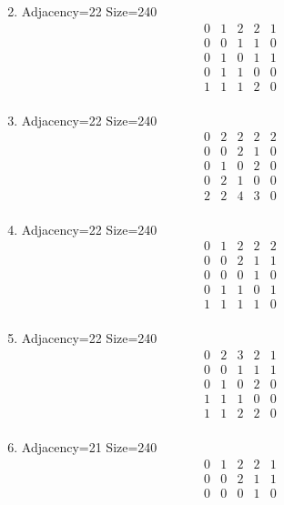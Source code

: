 \documentclass[12pt]{article}
\begin{document}
\begin{multicols}{3}
\begin{enumerate}
\begin{equation*}
\end{equation*}
\item Adjacency=22 Size=240
\begin{equation*}
\begin{array}{ccccc}
0&1&2&2&1\\
0&0&1&1&0\\
0&1&0&1&1\\
0&1&1&0&0\\
1&1&1&2&0\\
\end{array}
\end{equation*}
\item Adjacency=22 Size=240
\begin{equation*}
\begin{array}{ccccc}
0&2&2&2&2\\
0&0&2&1&0\\
0&1&0&2&0\\
0&2&1&0&0\\
2&2&4&3&0\\
\end{array}
\end{equation*}
\item Adjacency=22 Size=240
\begin{equation*}
\begin{array}{ccccc}
0&1&2&2&2\\
0&0&2&1&1\\
0&0&0&1&0\\
0&1&1&0&1\\
1&1&1&1&0\\
\end{array}
\end{equation*}
\item Adjacency=22 Size=240
\begin{equation*}
\begin{array}{ccccc}
0&2&3&2&1\\
0&0&1&1&1\\
0&1&0&2&0\\
1&1&1&0&0\\
1&1&2&2&0\\
\end{array}
\end{equation*}
\item Adjacency=21 Size=240
\begin{equation*}
\begin{array}{ccccc}
0&1&2&2&1\\
0&0&2&1&1\\
0&0&0&1&0\\

\end{array}
\end{equation*}
\end{enumerate}
\end{multicols}
\end{document}
